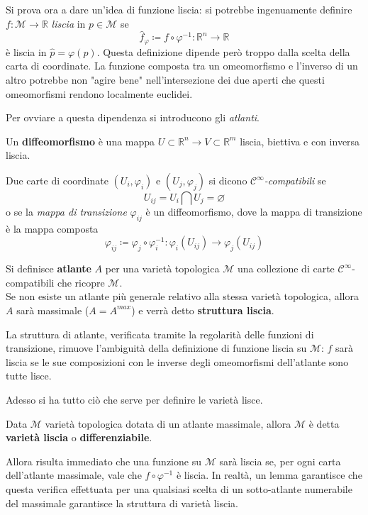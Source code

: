 Si prova ora a dare un'idea di funzione liscia: si potrebbe ingenuamente definire $f : \mathcal{M} \rightarrow \mathbb{R}$ \emph{liscia} in $p \in \mathcal{M}$ se
\[
    \hat f_\varphi \coloneqq f \circ \varphi^{-1} : \mathbb{R}^n \rightarrow \mathbb{R}
\]
è liscia in $\hat p = \varphi(p)$.
Questa definizione dipende però troppo dalla scelta della carta di coordinate.
La funzione composta tra un omeomorfismo e l'inverso di un altro potrebbe non "agire bene" nell'intersezione dei due aperti che questi omeomorfismi rendono localmente euclidei.

Per ovviare a questa dipendenza si introducono gli \emph{atlanti}.
\begin{definition}
    Un \textbf{diffeomorfismo} è una mappa $U \subset \mathbb{R}^n \rightarrow V \subset \mathbb{R}^m$ liscia, biettiva e con inversa liscia.
\end{definition}
Due carte di coordinate $(U_i, \varphi_i)$ e $(U_j, \varphi_j)$ si dicono \emph{$\mathcal{C}^\infty$-compatibili} se
\[
    U_{ij} = U_i \bigcap U_j = \varnothing
\]
o se la \emph{mappa di transizione} $\varphi_{ij}$ è un diffeomorfismo, dove la mappa di transizione è la mappa composta
\[
    \varphi_{ij} \coloneqq \varphi_j \circ \varphi_i^{-1} : \varphi_i (U_{ij}) \rightarrow \varphi_j (U_{ij})
\]
\begin{definition}
    Si definisce \textbf{atlante} $A$ per una varietà topologica $\mathcal{M}$ una collezione di carte $\mathcal{C}^\infty$-compatibili che ricopre $\mathcal{M}$. \\
    Se non esiste un atlante più generale relativo alla stessa varietà topologica, allora $A$ sarà massimale ($A = A^{max}$) e verrà detto \textbf{struttura liscia}.
\end{definition}
La struttura di atlante, verificata tramite la regolarità delle funzioni di transizione, rimuove l'ambiguità della definizione di funzione liscia su $\mathcal{M}$: $f$ sarà liscia se le sue composizioni con le inverse degli omeomorfismi dell'atlante sono tutte lisce.

Adesso si ha tutto ciò che serve per definire le varietà lisce.
\begin{definition}
    Data $\mathcal{M}$ varietà topologica dotata di un atlante massimale, allora $\mathcal{M}$ è detta \textbf{varietà liscia} o \textbf{differenziabile}.
\end{definition}
Allora risulta immediato che una funzione su $\mathcal{M}$ sarà liscia se, per ogni carta dell'atlante massimale, vale che $f \circ \varphi^{-1}$ è liscia.
In realtà, un lemma garantisce che questa verifica effettuata per una qualsiasi scelta di un sotto-atlante numerabile del massimale garantisce la struttura di varietà liscia.

